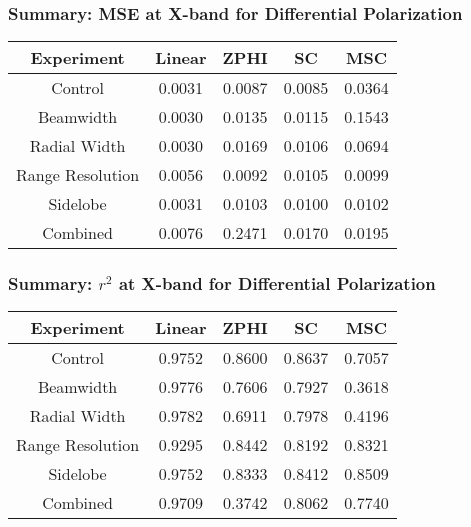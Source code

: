 \begin{frame}
    \frametitle{Summary: MSE at X-band for Differential Polarization}
    \begin{center}
        \begin{tabular}{| c | c | c | c | c |}
            \hline
            Experiment & Linear & ZPHI & SC & MSC \\
            \hline
            \hline
            Control & 0.0031 & 0.0087 & 0.0085 & 0.0364 \\
            Beamwidth & 0.0030 & 0.0135 & 0.0115 & 0.1543 \\
            Radial Width & 0.0030 & 0.0169 & 0.0106 & 0.0694 \\
            Range Resolution & 0.0056 & 0.0092 & 0.0105 & 0.0099 \\
            Sidelobe & 0.0031 & 0.0103 & 0.0100 & 0.0102 \\
            Combined & 0.0076 & 0.2471 & 0.0170 & 0.0195 \\
            \hline
        \end{tabular}
    \end{center}
\end{frame}

\begin{frame}
    \frametitle{Summary: $r^2$ at X-band for Differential Polarization}
    \begin{center}
        \begin{tabular}{| c | c | c | c | c |}
            \hline
            Experiment & Linear & ZPHI & SC & MSC \\
            \hline
            \hline
            Control & 0.9752 & 0.8600 & 0.8637 & 0.7057 \\
            Beamwidth & 0.9776 & 0.7606 & 0.7927 & 0.3618 \\
            Radial Width & 0.9782 & 0.6911 & 0.7978 & 0.4196 \\
            Range Resolution & 0.9295 & 0.8442 & 0.8192 & 0.8321 \\
            Sidelobe & 0.9752 & 0.8333 & 0.8412 & 0.8509 \\
            Combined & 0.9709 & 0.3742 & 0.8062 & 0.7740 \\
            \hline
        \end{tabular}
    \end{center}
\end{frame}

